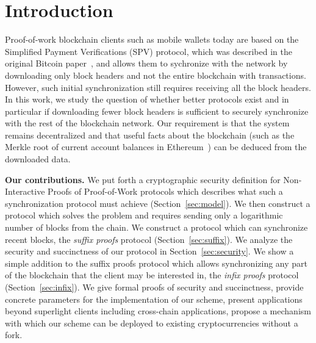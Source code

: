 \section{Introduction}

Proof-of-work blockchain clients such as mobile wallets today are based on the
Simplified Payment Verifications (SPV) protocol, which was described in the
original Bitcoin paper~\cite{bitcoin}, and allows them to sychronize with the
network by downloading only block headers and not the entire blockchain with
transactions. However, such initial synchronization still requires receiving all
the block headers. In this work, we study the question of whether better
protocols exist and in particular if downloading fewer block headers is
sufficient to securely synchronize with the rest of the blockchain network. Our
requirement is that the system remains decentralized and that useful facts about
the blockchain (such as the Merkle root of current account balances in
Ethereum~\cite{wood,vitalik}) can be deduced from the downloaded data.

\noindent\textbf{Our contributions.}
We put forth a cryptographic security definition for
Non-Interactive Proofs of Proof-of-Work protocols which describes what such a
synchronization protocol must achieve (Section~\ref{sec:model}). We then
construct a protocol which solves the problem and requires sending only a
logarithmic number of blocks from the chain. We construct a protocol which can
synchronize recent blocks, the \emph{suffix proofs} protocol
(Section~\ref{sec:suffix}).
We analyze the security and succinctness of
our protocol in Section~\ref{sec:security}.
We show a simple addition to the suffix proofs protocol
which allows synchronizing any part of the blockchain that the client may be
interested in, the \emph{infix proofs} protocol (Section~\ref{sec:infix}).
We give formal proofs of security and succinctness, provide
concrete parameters for the implementation of our scheme, present applications
beyond superlight clients including cross-chain applications, propose a mechanism with which our scheme can
be deployed to existing cryptocurrencies without a fork.


%
%
%

